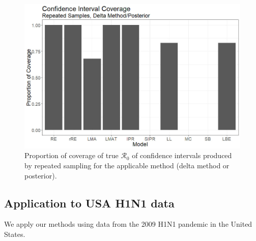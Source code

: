 \documentclass[12pt]{article}
\newcommand{\rr}{\ensuremath{\mathcal{R}_0}}
\begin{document}
\begin{figure}[H]
	\begin{center}
		\includegraphics[scale=0.5]{images/coverage2.jpg}
		\caption{Proportion of coverage of true $\rr$ of confidence intervals produced by repeated sampling for the applicable method (delta method or posterior).}
		\label{fig:coverage}	
	\end{center}
\end{figure}




      \subsection{Application to USA H1N1 data}\label{sec:real-data}
      We apply our methods using data from the 2009 H1N1 pandemic in the United States.
\end{document}
